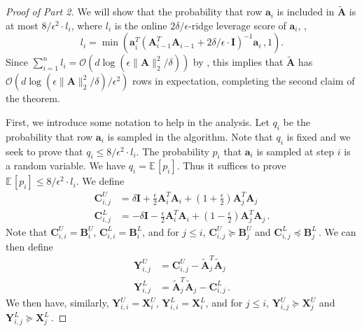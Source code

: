 \documentclass{toc}
\newcommand{\Oh}{\ensuremath{\mathcal{O}}}
\newcommand{\bv}[1]{\mathbf{#1}}
\newcommand{\norm}[1]{\|#1\|}
\newcommand{\expct}[3]{\mathbb{E}_{{#1}_{#2}}\left[#3\right]}
\begin{document}
\begin{proof}[Proof of  Part 2]
  We will show that the probability that row $\bv{a}_i$ is included in $\bv{\tilde{A}}$ is at most $8/\epsilon^2 \cdot  l_i$, where $l_i$ is the online $2 \delta/\epsilon$-ridge leverage score of $\bv{a}_i$, \ie,
%
%
$$l_i = \min(\bv{a}_i^T \left ( \bv{A}_{i-1}^T \bv{A}_{i-1} + 2 \delta/ \epsilon \cdot \bv{I} \right )^{-1} \bv{a}_i\,, 1).$$  %
Since $\sum_{i=1}^n l_i = \Oh(d \log (\epsilon\norm{\bv A}_2^2/\delta))$ by , this implies that $\bv{\tilde A}$ has $ \Oh(d \log (\epsilon\norm{\bv A}_2^2/\delta)/\epsilon^2)$ rows in expectation, completing the second claim of the theorem.


First, we introduce some notation to help in the analysis. Let $q_i$ be the probability that row $\bv{a}_i$ is sampled in the algorithm. Note that $q_i$ is fixed and we seek to prove that $q_i \le 8/\epsilon^2\cdot  l_i$. The probability $p_i$ that $\bv{a}_i$ is sampled at step $i$ is a random variable. We have $q_i = \expct{}{}{p_i}$. Thus it suffices to prove $\expct{}{}{p_i} \le  8/\epsilon^2 \cdot  l_i$. We define
\begin{align*}
\bv{C}^U_{i,j} &= \delta \bv{I} + \frac{\epsilon}{2} \bv{A}_i^T \bv{A}_i + \left ( 1 + \frac{\epsilon}{2} \right ) \bv{A}_j^T \bv{A}_j \\
\bv{C}^L_{i,j} &= -\delta \bv{I} - \frac{\epsilon}{2} \bv{A}_i^T \bv{A}_i + \left ( 1 - \frac{\epsilon}{2} \right ) \bv{A}_j^T \bv{A}_j\,.
\end{align*}
Note that $\bv{C}^U_{i,i} = \bv{B}^U_i$, $\bv{C}^L_{i,i} = \bv{B}^L_i$, and for $j \leq i$, $\bv{C}^U_{i,j} \succeq \bv{B}^U_j$ and $\bv{C}^L_{i,j} \preceq \bv{B}^L_j$\,.
We can then define
\begin{align*}
\bv{Y}^U_{i,j} &= \bv{C}^U_{i,j} - \bv{\tilde{A}}_j^T \bv{\tilde{A}}_j \\
\bv{Y}^L_{i,j} &= \bv{\tilde{A}}_j^T \bv{\tilde{A}}_j - \bv{C}^L_{i,j}\,.
\end{align*}
We then have, similarly, $\bv{Y}^U_{i,i} = \bv{X}^U_i$, $\bv{Y}^L_{i,i} = \bv{X}^L_i$, and for $j \leq i$, $\bv{Y}^U_{i,j} \succeq \bv{X}^U_j$ and $\bv{Y}^L_{i,j} \succeq \bv{X}^L_j$\,.


\end{proof}
\end{document}
